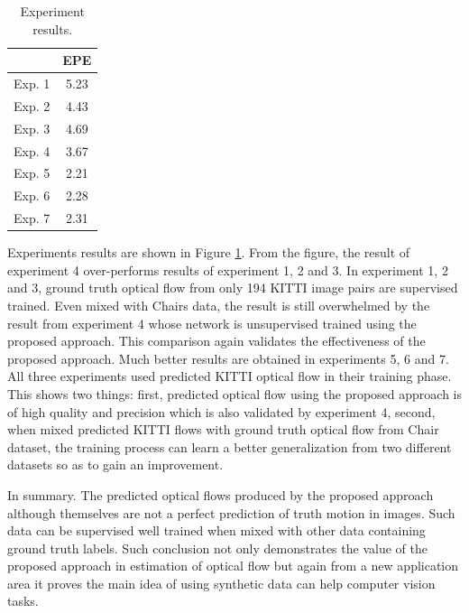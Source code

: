 \documentclass{iitthesis}
\begin{document}
\begin{table}[thbp]
\centering
\caption{Experiment results.}
\label{tab: optical flow experiments train using predicted flows}
\begin{tabular}{cc}
\hline
\hline
       & EPE  \\ \hline
Exp. 1 & 5.23 \\ 
Exp. 2 & 4.43 \\ 
Exp. 3 & 4.69 \\ 
Exp. 4 & 3.67 \\ 
Exp. 5 & 2.21 \\ 
Exp. 6 & 2.28 \\ 
Exp. 7 & 2.31 \\ \hline
\end{tabular}
\end{table}

Experiments results are shown in Figure \ref{tab: optical flow experiments train using predicted flows}. From the figure, the result of experiment 4 over-performs results of experiment 1, 2 and 3. In experiment 1, 2 and 3, ground truth optical flow from only 194 KITTI image pairs are supervised trained. Even mixed with Chairs data, the result is still overwhelmed by the result from experiment 4 whose network is unsupervised trained using the proposed approach. This comparison again validates the effectiveness of the proposed approach. Much better results are obtained in experiments 5, 6 and 7. All three experiments used predicted KITTI optical flow in their training phase. This shows two things: first, predicted optical flow using the proposed approach is of high quality and precision which is also validated by experiment 4, second, when mixed predicted KITTI flows with ground truth optical flow from Chair dataset, the training process can learn a better generalization from two different datasets so as to gain an improvement. 

In summary. The predicted optical flows produced by the proposed approach although themselves are not a perfect prediction of truth motion in images. Such data can be supervised well trained when mixed with other data containing ground truth labels. Such conclusion not only demonstrates the value of the proposed approach in estimation of optical flow but again from a new application area it proves the main idea of using synthetic data can help computer vision tasks.  

\clearpage

 \label{chapter: synthetic gap}
\end{document}
